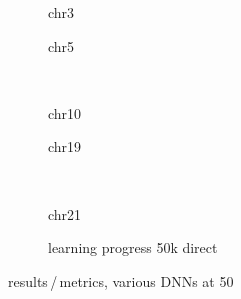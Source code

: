 \begin{figure}[p]%
    \begin{subfigure}{0.45\textwidth}
        \scriptsize
        \caption{chr3}
    \end{subfigure} \hfill
    \begin{subfigure}{0.45\textwidth}
        \scriptsize
        \caption{chr5}
    \end{subfigure}\\[5mm]
    \begin{subfigure}{0.45\textwidth}
        \scriptsize
        \caption{chr10}
    \end{subfigure}\hfill
    \begin{subfigure}{0.45\textwidth}
        \scriptsize
        \caption{chr19}
    \end{subfigure}\\[3mm]
    \begin{subfigure}{0.45\textwidth}
        \scriptsize
        \caption{chr21}
    \end{subfigure}\hfill
    \begin{subfigure}{0.45\textwidth}
        \caption{learning progress 50k direct} \label{fig:results:50k_lossEpochs}
    \end{subfigure}
    \caption{results\,/\,metrics, various DNNs at \SI{50}{\kilo\bp}} \label{fig:results:DNN50k_pearson}
\end{figure}
